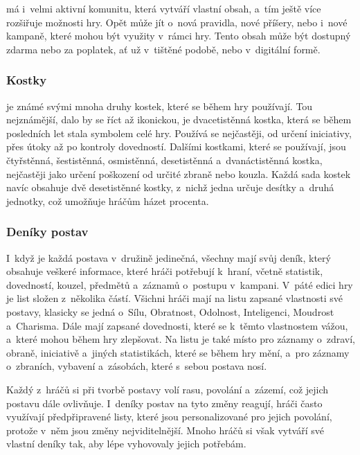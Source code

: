 \dnd{} má i~velmi aktivní komunitu, která vytváří vlastní obsah, a~tím ještě více rozšiřuje možnosti hry. Opět může jít o~nová pravidla, nové příšery, nebo i~nové kampaně, které mohou být využity v~rámci hry. Tento obsah může být dostupný zdarma nebo za poplatek, ať už v~tištěné podobě, nebo v~digitální formě.

\subsubsection*{Kostky}
\label{subsubsec:dnd_comp_dice}

\dnd{} je známé svými mnoha druhy kostek, které se během hry používají. Tou nejznámější, dalo by se říct až ikonickou, je dvacetistěnná kostka, která se během posledních let stala symbolem celé hry. Používá se nejčastěji, od určení iniciativy, přes útoky až po kontroly dovedností. Dalšími kostkami, které se používají, jsou čtyřstěnná, šestistěnná, osmistěnná, desetistěnná a~dvanáctistěnná kostka, nejčastěji jako určení poškození od určité zbraně nebo kouzla. Každá sada kostek navíc obsahuje dvě desetistěnné kostky, z~nichž jedna určuje desítky a~druhá jednotky, což umožňuje hráčům házet procenta.

\subsubsection*{Deníky postav}
\label{subsubsec:dnd_comp_sheets}

I~když je každá postava v~družině jedinečná, všechny mají svůj deník, který obsahuje veškeré informace, které hráči potřebují k~hraní, včetně statistik, dovedností, kouzel, předmětů a~záznamů o~postupu v~kampani. V~páté edici hry je list složen z~několika částí. Všichni hráči mají na listu zapsané vlastnosti své postavy, klasicky se jedná o~Sílu, Obratnost, Odolnost, Inteligenci, Moudrost a~Charisma. Dále mají zapsané dovednosti, které se k~těmto vlastnostem vážou, a~které mohou během hry zlepšovat. Na listu je také místo pro záznamy o~zdraví, obraně, iniciativě a~jiných statistikách, které se během hry mění, a~pro záznamy o~zbraních, vybavení a~zásobách, které s~sebou postava nosí.

Každý z~hráčů si při tvorbě postavy volí rasu, povolání a~zázemí, což jejich postavu dále ovlivňuje. I~deníky postav na tyto změny reagují, hráči často využívají předpřipravené listy, které jsou personalizované pro jejich povolání, protože v~něm jsou změny nejviditelnější. Mnoho hráčů si však vytváří své vlastní deníky tak, aby lépe vyhovovaly jejich potřebám.

